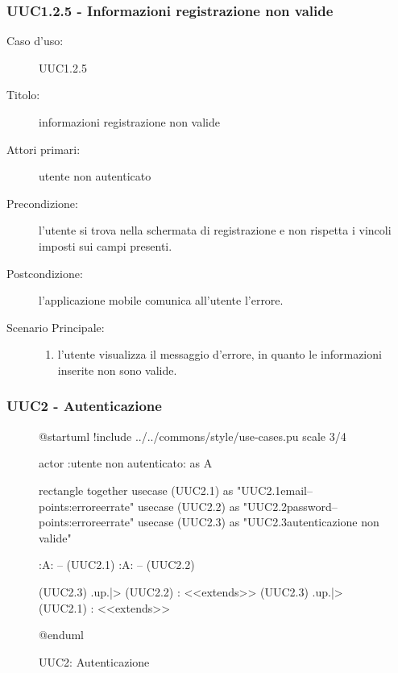 \documentclass[../analisi-dei-requisiti.tex]{subfiles}
\begin{document}
\subsubsection{UUC1.2.5 - Informazioni registrazione non valide}%
\label{subsub:UUC1.2.5utente}
\begin{description}
  \item[Caso d’uso:] UUC1.2.5
  \item[Titolo:] informazioni registrazione non valide
  \item[Attori primari:] utente non autenticato
  \item[Precondizione:] l'utente si trova nella schermata di registrazione e non rispetta i vincoli imposti sui campi presenti.
  \item[Postcondizione:] l'applicazione mobile comunica all'utente l'errore.
  \item[Scenario Principale:]
        \begin{enumerate}
          \item l'utente visualizza il messaggio d'errore, in quanto le informazioni inserite non sono valide.
        \end{enumerate}
\end{description}

\subsubsection{UUC2 - Autenticazione}%
\label{subsub:UUC2utente}

\begin{figure}[h!]
  \centering
  \begin{plantuml}
  @startuml
  !include ../../commons/style/use-cases.pu
  scale 3/4

  actor :utente non autenticato: as A

  rectangle {
    together {
      usecase (UUC2.1) as "UUC2.1\nInserimento email\n--\nExtension points:\nVisualizzazione errore\ncredenziali errate"
      usecase (UUC2.2) as "UUC2.2\nInserimento password\n--\nExtension points:\nVisualizzazione errore\ncredenziali errate"
      usecase (UUC2.3) as "UUC2.3\nInformazioni autenticazione non valide"
    }
  }

  :A: -- (UUC2.1)
  :A: -- (UUC2.2)

  (UUC2.3) .up.|> (UUC2.2) : <<extends>>
  (UUC2.3) .up.|> (UUC2.1) : <<extends>>

  @enduml
  \end{plantuml}
  \caption{UUC2: Autenticazione}
  \label{fig:uuc2}
\end{figure}
\end{document}
